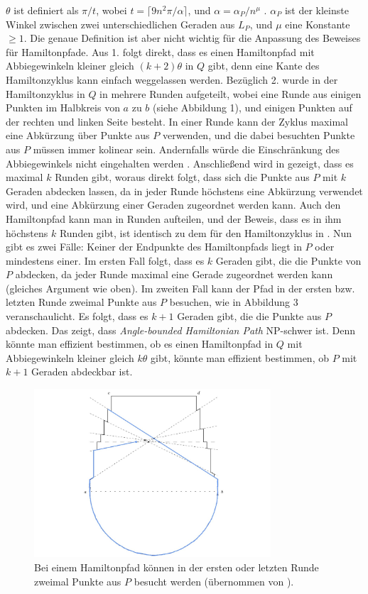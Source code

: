 \documentclass[a4paper, 10pt, ngerman]{article}
\begin{document}
$\theta$ ist definiert als $\pi / t$, wobei $t = \lceil 9 n^2 \pi / \alpha \rceil$, und $\alpha = \alpha_P / n^\mu$ \cite{nphard}. $\alpha_P$ ist der kleinste Winkel zwischen zwei unterschiedlichen Geraden aus $L_P$, und $\mu$ eine Konstante $\ge 1$. Die genaue Definition ist aber nicht wichtig für die Anpassung des Beweises für Hamiltonpfade. Aus 1. folgt direkt, dass es einen Hamiltonpfad mit Abbiegewinkeln kleiner gleich $(k + 2)\theta$ in $Q$ gibt, denn eine Kante des Hamiltonzyklus kann einfach weggelassen werden. Bezüglich 2. wurde in \cite{nphard} der Hamiltonzyklus in $Q$ in mehrere Runden aufgeteilt, wobei eine Runde aus einigen Punkten im Halbkreis von $a$ zu $b$ (siehe Abbildung 1), und einigen Punkten auf der rechten und linken Seite besteht. In einer Runde kann der Zyklus maximal eine Abkürzung über Punkte aus $P$ verwenden, und die dabei besuchten Punkte aus $P$ müssen immer kolinear sein. Andernfalls würde die Einschränkung des Abbiegewinkels nicht eingehalten werden \cite{nphard}. Anschließend wird in \cite{nphard} gezeigt, dass es maximal $k$ Runden gibt, woraus direkt folgt, dass sich die Punkte aus $P$ mit $k$ Geraden abdecken lassen, da in jeder Runde höchstens eine Abkürzung verwendet wird, und eine Abkürzung einer Geraden zugeordnet werden kann. Auch den Hamiltonpfad kann man in Runden aufteilen, und der Beweis, dass es in ihm höchstens $k$ Runden gibt, ist identisch zu dem für den Hamiltonzyklus in \cite{nphard}. Nun gibt es zwei Fälle: Keiner der Endpunkte des Hamiltonpfads liegt in $P$ oder mindestens einer. Im ersten Fall folgt, dass es $k$ Geraden gibt, die die Punkte von $P$ abdecken, da jeder Runde maximal eine Gerade zugeordnet werden kann (gleiches Argument wie oben). Im zweiten Fall kann der Pfad in der ersten bzw. letzten Runde zweimal Punkte aus $P$ besuchen, wie in Abbildung 3 veranschaulicht. Es folgt, dass es $k + 1$ Geraden gibt, die die Punkte aus $P$ abdecken. Das zeigt, dass \emph{Angle-bounded Hamiltonian Path} NP-schwer ist. Denn könnte man effizient bestimmen, ob es einen Hamiltonpfad in $Q$ mit Abbiegewinkeln kleiner gleich $k \theta$ gibt, könnte man effizient bestimmen, ob $P$ mit $k + 1$ Geraden abdeckbar ist.

\begin{figure}[h]
    \centering
    \includegraphics[width=250pt]{grafiken/wenigerkrumm-np3.jpg}
    \caption{Bei einem Hamiltonpfad können in der ersten oder letzten Runde zweimal Punkte aus $P$ besucht werden (übernommen von \cite{nphard}).}
\end{figure}
\end{document}
